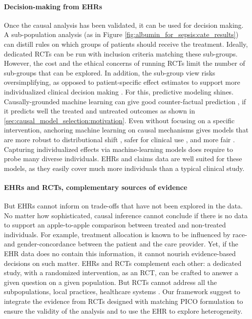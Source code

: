 \documentclass[french,12pt,twoside,a4paper]{book}
\begin{document}
\paragraph{Decision-making from EHRs}

Once the causal analysis has been validated, it can be used for decision
making. A sub-population analysis (as in
Figure \ref{fig:albumin_for_sepsis:cate_results}) can distill rules on
which groups of patients should receive the treatment. Ideally, dedicated
RCTs can be run with inclusion criteria matching these sub-groups.
However, the cost and the ethical concerns of running RCTs limit the
number of sub-groups that can be explored.
%
In addition, the sub-group view risks oversimplifying, as opposed to
patient-specific effect estimates to support more individualized clinical
decision making \citep{kent2018personalized}.  For this, predictive modeling
shines. Causally-grounded machine learning can give good counter-factual
prediction \citep{prosperi2020causal,hernan2019second,richens2020improving}, if
it predicts well the treated and untreated outcomes as shown in
\ref{sec:causal_model_selection:motivation}. Even without focusing on a specific
intervention, anchoring machine learning on causal mechanisms gives models that
are more robust to distributional shift \citep{scholkopf2021toward}, safer for
clinical use \citep{richens2020improving}, and more fair
\citep{plecko2022causal}.
%
Capturing individualized effects via machine-learning models does require
to probe many diverse individuals. EHRs and claims data are well suited
for these models, as they easily cover much more individuals
than a typical clinical study.


\paragraph{EHRs and RCTs, complementary sources of evidence} But EHRs cannot inform on trade-offs that have not been explored in the
data. No matter how sophisticated, causal inference cannot conclude if
there is no data to support an apple-to-apple comparison between treated
and non-treated individuals. For example, treatment allocation is known
to be influenced by race- and gender-concordance between the patient and the
care provider. Yet, if the EHR data does no contain this information, it
cannot nourish evidence-based decisions on such matter.
%
EHRs and RCTs complement each other:
a dedicated study, with a randomized intervention, as an RCT, can be
crafted to answer a given question on a given population. But RCTs cannot
address all the subpopulations, local practices, healthcare systems
\citep{rothwell2006factors,travers2007external,kennedy2015literature}.
Our framework suggest to integrate the evidence from RCTs designed with
matching PICO formulation to ensure the validity of the analysis and to
use the EHR to explore heterogeneity.
\end{document}

